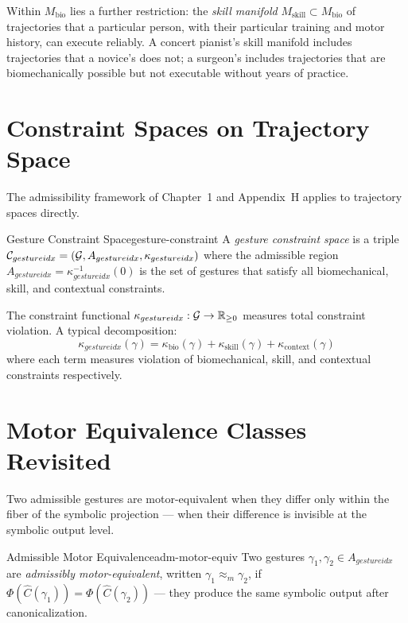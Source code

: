 Within $M_\text{bio}$ lies a further restriction: the \emph{skill
manifold} $M_\text{skill} \subset M_\text{bio}$ of trajectories that
a particular person, with their particular training and motor history,
can execute reliably. A concert pianist's skill manifold includes
trajectories that a novice's does not; a surgeon's includes trajectories
that are biomechanically possible but not executable without years of
practice.

\section{Constraint Spaces on Trajectory Space}

The admissibility framework of Chapter~1 and Appendix~H applies to
trajectory spaces directly.

\begin{definition}{Gesture Constraint Space}{gesture-constraint}
  A \emph{gesture constraint space} is a triple
  $\mathcal{C}_{gestureidx} = (\mathcal{G}, A_{gestureidx}, \kappa_{gestureidx})$
  where the admissible region $A_{gestureidx} = \kappa_{gestureidx}^{-1}(0)$
  is the set of gestures that satisfy all biomechanical, skill, and
  contextual constraints.
\end{definition}

The constraint functional $\kappa_{gestureidx} : \mathcal{G} \to \mathbb{R}_{\geq 0}$
measures total constraint violation. A typical decomposition:
\[
  \kappa_{gestureidx}(\gamma) = \kappa_\text{bio}(\gamma) + \kappa_\text{skill}(\gamma)
  + \kappa_\text{context}(\gamma)
\]
where each term measures violation of biomechanical, skill, and contextual
constraints respectively.

\section{Motor Equivalence Classes Revisited}

Two admissible gestures are motor-equivalent when they differ only within
the fiber of the symbolic projection — when their difference is invisible
at the symbolic output level.

\begin{definition}{Admissible Motor Equivalence}{adm-motor-equiv}
  Two gestures $\gamma_1, \gamma_2 \in A_{gestureidx}$ are
  \emph{admissibly motor-equivalent}, written $\gamma_1 \approx_m \gamma_2$,
  if $\Phi(\hat{C}(\gamma_1)) = \Phi(\hat{C}(\gamma_2))$ — they produce
  the same symbolic output after canonicalization.
\end{definition}

